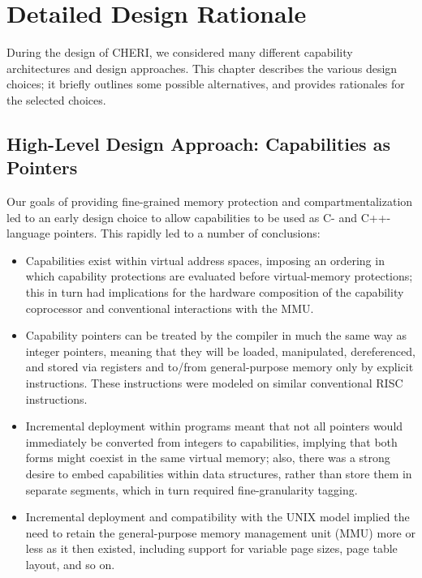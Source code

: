 \chapter{Detailed Design Rationale}
\label{chap:rationale}

During the design of CHERI, we considered many different capability
architectures and design approaches. This chapter describes the various
design choices; it briefly outlines some possible alternatives, and provides
rationales for the selected choices.

\section{High-Level Design Approach: Capabilities as Pointers}

Our goals of providing fine-grained memory protection and compartmentalization
led to an early design choice to allow capabilities to be used as C- and
C++-language pointers.
This rapidly led to a number of conclusions:

\begin{itemize}
\item Capabilities exist within virtual address spaces, imposing an ordering in
  which capability protections are evaluated before virtual-memory
  protections; this in turn had implications for the hardware composition of
  the capability coprocessor and conventional interactions with the MMU.

\item Capability pointers can be treated by the compiler in much the same way
  as integer pointers, meaning that they will be loaded, manipulated,
  dereferenced, and stored via registers and to/from general-purpose memory
  only by explicit instructions.
  These instructions were modeled on similar conventional RISC instructions.

\item Incremental deployment within programs meant that not all pointers would
  immediately be converted from integers to capabilities, implying that both
  forms might coexist in the same virtual memory;
  also, there was a strong desire to embed capabilities
  within data structures, rather than store them in separate segments,
  which in turn required fine-granularity tagging.

\item Incremental deployment and compatibility with the UNIX model implied
  the need to retain
  the general-purpose memory management unit (MMU) more or less as
  it then existed, including support for variable page sizes, page table layout,
  and so on.
\end{itemize}

